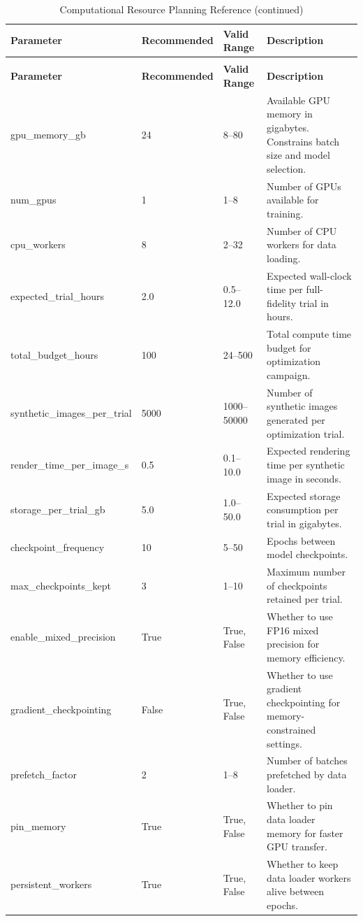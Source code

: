 \begin{longtable}{p{3.5cm}p{2cm}p{2.5cm}p{5.5cm}}
\caption{Computational Resource Planning Reference} \label{tab:resources} \\
\toprule
\textbf{Parameter} & \textbf{Recommended} & \textbf{Valid Range} & \textbf{Description} \\
\midrule
\endfirsthead
\caption[]{Computational Resource Planning Reference (continued)} \\
\toprule
\textbf{Parameter} & \textbf{Recommended} & \textbf{Valid Range} & \textbf{Description} \\
\midrule
\endhead
\bottomrule
\endfoot
\bottomrule
\endlastfoot
gpu\_memory\_gb & 24 & 8--80 & Available GPU memory in gigabytes. Constrains batch size and model selection. \\
\addlinespace
num\_gpus & 1 & 1--8 & Number of GPUs available for training. \\
\addlinespace
cpu\_workers & 8 & 2--32 & Number of CPU workers for data loading. \\
\addlinespace
expected\_trial\_hours & 2.0 & 0.5--12.0 & Expected wall-clock time per full-fidelity trial in hours. \\
\addlinespace
total\_budget\_hours & 100 & 24--500 & Total compute time budget for optimization campaign. \\
\addlinespace
synthetic\_images\_per\_trial & 5000 & 1000--50000 & Number of synthetic images generated per optimization trial. \\
\addlinespace
render\_time\_per\_image\_s & 0.5 & 0.1--10.0 & Expected rendering time per synthetic image in seconds. \\
\addlinespace
storage\_per\_trial\_gb & 5.0 & 1.0--50.0 & Expected storage consumption per trial in gigabytes. \\
\addlinespace
checkpoint\_frequency & 10 & 5--50 & Epochs between model checkpoints. \\
\addlinespace
max\_checkpoints\_kept & 3 & 1--10 & Maximum number of checkpoints retained per trial. \\
\addlinespace
enable\_mixed\_precision & True & True, False & Whether to use FP16 mixed precision for memory efficiency. \\
\addlinespace
gradient\_checkpointing & False & True, False & Whether to use gradient checkpointing for memory-constrained settings. \\
\addlinespace
prefetch\_factor & 2 & 1--8 & Number of batches prefetched by data loader. \\
\addlinespace
pin\_memory & True & True, False & Whether to pin data loader memory for faster GPU transfer. \\
\addlinespace
persistent\_workers & True & True, False & Whether to keep data loader workers alive between epochs. \\
\end{longtable}

